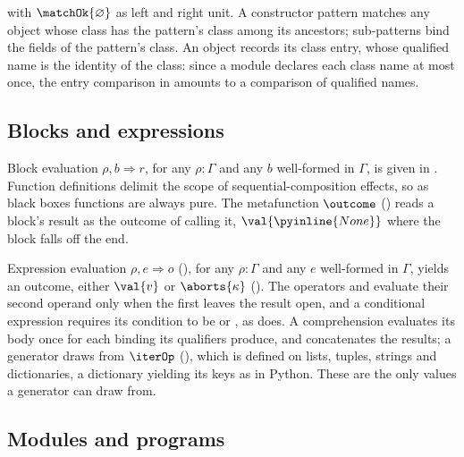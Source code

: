 with $\matchOk{\varnothing}$ as left and right unit.
A constructor pattern matches any object whose class has the
pattern's class among its ancestors; sub-patterns bind the fields of the pattern's class. An object records
its class entry, whose qualified name is the identity of the class: since a module declares each class name at
most once, the entry comparison in  amounts to a comparison of qualified names.



\subsection{Blocks and expressions}

Block evaluation $\rho, b \Rightarrow r$, for any $\rho : \Gamma$ and any $b$ well-formed in $\Gamma$,
is given in . Function definitions delimit
the scope of sequential-composition effects, so as black boxes functions are always pure. The metafunction $\outcome$ (\speconly{\S\ref{aux:outcome}}) reads a block's result as
the outcome of calling it, $\val{\pyinline{None}}$ where the block falls off the end.

Expression evaluation $\rho, e \Rightarrow o$ (), for any $\rho : \Gamma$ and any $e$ well-formed in $\Gamma$, yields an
outcome, either $\val{v}$ or $\aborts{\kappa}$ (). The operators
 and  evaluate their second operand only when the first leaves the result open, and
a conditional expression requires its condition to be  or , as
 does. A comprehension evaluates its body once for each binding its qualifiers produce, and
concatenates the results; a generator draws from $\iterOp$ (\speconly{\S\ref{aux:iter}}), which is
defined on lists, tuples, strings and dictionaries, a dictionary yielding its keys as in Python.
These are the only values a generator can draw from.



\subsection{Modules and programs}

